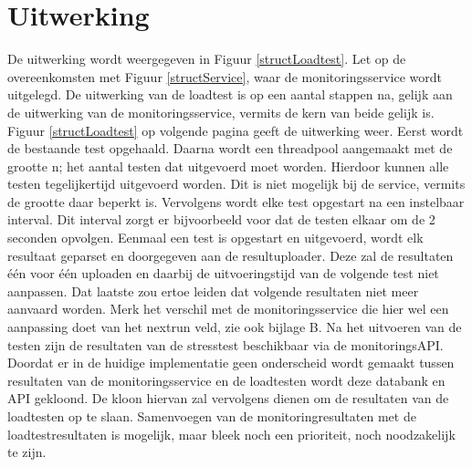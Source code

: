 \section{Uitwerking}
\npar
De uitwerking wordt weergegeven in Figuur \ref{structLoadtest}. Let op de overeenkomsten met Figuur \ref{structService}, waar de monitoringsservice wordt uitgelegd. De uitwerking van de loadtest is op een aantal stappen na, gelijk aan de uitwerking van de monitoringsservice, vermits de kern van beide gelijk is. 
\npar
Figuur \ref{structLoadtest} op volgende pagina geeft de uitwerking weer. Eerst wordt de bestaande test opgehaald. Daarna wordt een threadpool aangemaakt met de grootte n; het aantal testen dat uitgevoerd moet worden. Hierdoor kunnen alle testen tegelijkertijd uitgevoerd worden. Dit is niet mogelijk bij de service, vermits de grootte daar beperkt is. Vervolgens wordt elke test opgestart na een instelbaar interval. Dit interval zorgt er bijvoorbeeld voor dat de testen elkaar om de 2 seconden opvolgen.
\npar
Eenmaal een test is opgestart en uitgevoerd, wordt elk resultaat geparset en doorgegeven aan de resultuploader. Deze zal de resultaten \'e\'en voor \'e\'en uploaden en daarbij de uitvoeringstijd van de volgende test niet aanpassen. Dat laatste zou ertoe leiden dat volgende resultaten niet meer aanvaard worden. Merk het verschil met de monitoringsservice die hier wel een aanpassing doet van het nextrun veld, zie ook bijlage B.
\npar
Na het uitvoeren van de testen zijn de resultaten van de stresstest beschikbaar via de monitoringsAPI. Doordat er in de huidige implementatie geen onderscheid wordt gemaakt tussen resultaten van de monitoringsservice en de loadtesten wordt deze databank en API gekloond. De kloon hiervan zal vervolgens dienen om de resultaten van de loadtesten op te slaan. Samenvoegen van de monitoringresultaten met de loadtestresultaten is mogelijk, maar bleek noch een prioriteit, noch noodzakelijk te zijn.
\clearpage
